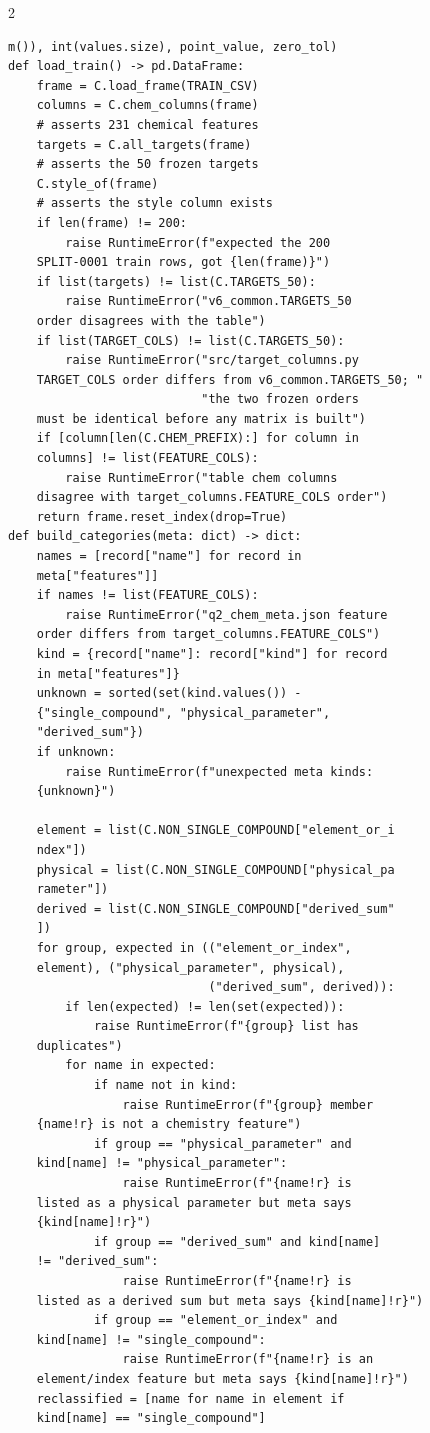 \begin{multicols}{2}
\begin{Verbatim}[fontsize=\scriptsize]
    m()), int(values.size), point_value, zero_tol)
def load_train() -> pd.DataFrame:
    frame = C.load_frame(TRAIN_CSV)
    columns = C.chem_columns(frame)
    # asserts 231 chemical features
    targets = C.all_targets(frame)
    # asserts the 50 frozen targets
    C.style_of(frame)
    # asserts the style column exists
    if len(frame) != 200:
        raise RuntimeError(f"expected the 200
    SPLIT-0001 train rows, got {len(frame)}")
    if list(targets) != list(C.TARGETS_50):
        raise RuntimeError("v6_common.TARGETS_50
    order disagrees with the table")
    if list(TARGET_COLS) != list(C.TARGETS_50):
        raise RuntimeError("src/target_columns.py
    TARGET_COLS order differs from v6_common.TARGETS_50; "
                           "the two frozen orders
    must be identical before any matrix is built")
    if [column[len(C.CHEM_PREFIX):] for column in
    columns] != list(FEATURE_COLS):
        raise RuntimeError("table chem columns
    disagree with target_columns.FEATURE_COLS order")
    return frame.reset_index(drop=True)
def build_categories(meta: dict) -> dict:
    names = [record["name"] for record in
    meta["features"]]
    if names != list(FEATURE_COLS):
        raise RuntimeError("q2_chem_meta.json feature
    order differs from target_columns.FEATURE_COLS")
    kind = {record["name"]: record["kind"] for record
    in meta["features"]}
    unknown = sorted(set(kind.values()) -
    {"single_compound", "physical_parameter",
    "derived_sum"})
    if unknown:
        raise RuntimeError(f"unexpected meta kinds:
    {unknown}")

    element = list(C.NON_SINGLE_COMPOUND["element_or_i
    ndex"])
    physical = list(C.NON_SINGLE_COMPOUND["physical_pa
    rameter"])
    derived = list(C.NON_SINGLE_COMPOUND["derived_sum"
    ])
    for group, expected in (("element_or_index",
    element), ("physical_parameter", physical),
                            ("derived_sum", derived)):
        if len(expected) != len(set(expected)):
            raise RuntimeError(f"{group} list has
    duplicates")
        for name in expected:
            if name not in kind:
                raise RuntimeError(f"{group} member
    {name!r} is not a chemistry feature")
            if group == "physical_parameter" and
    kind[name] != "physical_parameter":
                raise RuntimeError(f"{name!r} is
    listed as a physical parameter but meta says
    {kind[name]!r}")
            if group == "derived_sum" and kind[name]
    != "derived_sum":
                raise RuntimeError(f"{name!r} is
    listed as a derived sum but meta says {kind[name]!r}")
            if group == "element_or_index" and
    kind[name] != "single_compound":
                raise RuntimeError(f"{name!r} is an
    element/index feature but meta says {kind[name]!r}")
    reclassified = [name for name in element if
    kind[name] == "single_compound"]


\end{Verbatim}
\end{multicols}
